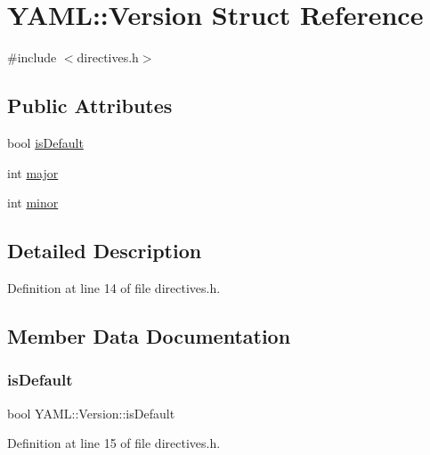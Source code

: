 \hypertarget{struct_y_a_m_l_1_1_version}{}\section{Y\+A\+ML\+::Version Struct Reference}
\label{struct_y_a_m_l_1_1_version}


{\ttfamily \#include $<$directives.\+h$>$}

\subsection*{Public Attributes}
\begin{DoxyCompactItemize}
\item 
bool \mbox{\hyperlink{struct_y_a_m_l_1_1_version_ab2d70ad017681464a96082e11ddae23e}{is\+Default}}
\item 
int \mbox{\hyperlink{struct_y_a_m_l_1_1_version_ac6232838bceed073a4afa803beebd1f8}{major}}
\item 
int \mbox{\hyperlink{struct_y_a_m_l_1_1_version_a1cda0e2892871497ed5f9d7937cf4bdb}{minor}}
\end{DoxyCompactItemize}


\subsection{Detailed Description}


Definition at line 14 of file directives.\+h.



\subsection{Member Data Documentation}
\mbox{\label{struct_y_a_m_l_1_1_version_ab2d70ad017681464a96082e11ddae23e}} 
\subsubsection{\texorpdfstring{isDefault}{isDefault}}
{\footnotesize\ttfamily bool Y\+A\+M\+L\+::\+Version\+::is\+Default}



Definition at line 15 of file directives.\+h.

\mbox{\label{struct_y_a_m_l_1_1_version_ac6232838bceed073a4afa803beebd1f8}} 
